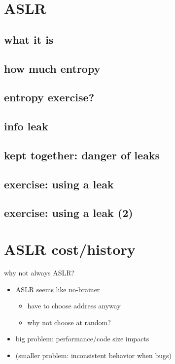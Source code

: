 

\section{ASLR}


\subsection{what it is}


\subsection{how much entropy}


\subsection{entropy exercise?}


\subsection{info leak}


\subsection{kept together: danger of leaks}



\subsection{exercise: using a leak}


\subsection{exercise: using a leak (2)}


\section{ASLR cost/history}
\begin{frame}{why not always ASLR?}
    \begin{itemize}
    \item ASLR seems like no-brainer
        \begin{itemize}
        \item have to choose address anyway
        \item why not choose at random?
        \end{itemize}
    \item big problem: performance/code size impacts
    \item (smaller problem: inconsistent behavior when bugs)
    \end{itemize}
\end{frame}

